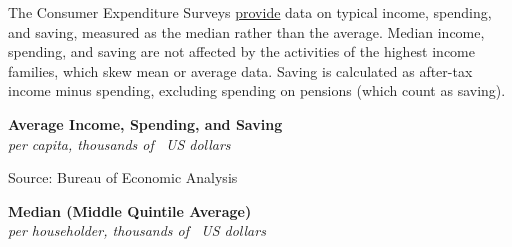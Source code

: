 \documentclass{report}
\makeatletter
\newcommand{\tbllink}[1]{\href{https://raw.githubusercontent.com/bdecon/US-chartbook/master/chartbook/data/#1}{\faTable}}
\newcommand*\short[1]{\expandafter\@gobbletwo\number\numexpr#1\relax}
\newcommand{\absnode}[3]{\node[below right, align=left] at (axis cs: #1,#2) {#3};}
\newcommand{\shdateaxisticks}{
		date coordinates in=x, axis line style={draw=none},
		xmax={2023-10-01},
		max space between ticks=40,	    
		xtick={{1990-01-01}, {1995-01-01}, {2000-01-01}, 
			{2005-01-01}, {2010-01-01}, {2015-01-01}, {2020-01-01}},
		minor xtick={},
		enlarge y limits={0.06}, enlarge x limits={0.01},
		}
\newcommand{\bbar}[2]{extra #1 ticks = {{#2}}, extra #1 tick labels = ,
		extra #1 tick style = {grid=major, grid style={thick, black!25}},}
\newcommand{\stdline}[4]{\addplot[very thick, no markers, color=#1] 
		table [x=#2, y=#3, col sep=comma] {#4};	}
\newcommand{\rbars}{
		\fill[color=black!10] (axis cs:{1990-07-01},\pgfkeysvalueof{/pgfplots/ymin}) rectangle 
			(axis cs:{1991-03-01}, \pgfkeysvalueof{/pgfplots/ymax});
		\fill[color=black!10] (axis cs:{2007-12-01},\pgfkeysvalueof{/pgfplots/ymin}) rectangle 
			(axis cs:{2009-07-01}, \pgfkeysvalueof{/pgfplots/ymax});
		\fill[color=black!10] (axis cs:{2001-03-01},\pgfkeysvalueof{/pgfplots/ymin}) rectangle 
			(axis cs:{2001-11-01}, \pgfkeysvalueof{/pgfplots/ymax});
		\fill[color=black!10] (axis cs:{2020-02-01},\pgfkeysvalueof{/pgfplots/ymin}) rectangle 
			(axis cs:{2020-05-01}, \pgfkeysvalueof{/pgfplots/ymax});}
\makeatother
\begin{document}
{\begin{minipage}{0.76\textwidth}


The Consumer Expenditure Surveys \href{https://www.bls.gov/cex/tables.htm}{provide} data on typical income, spending, and saving, measured as the median rather than the average. Median income, spending, and saving are not affected by the activities of the highest income families, which skew mean or average data. Saving is calculated as after-tax income minus spending, excluding spending on pensions (which count as saving). 
\end{minipage}
\vspace{2mm}

\begin{minipage}{0.435\textwidth}
\normalsize \textbf{Average Income, Spending, and Saving}\\
\footnotesize{\textit{per capita, thousands of \unskip \ US dollars}}
\vspace{5.9cm}

\hspace{4mm} 

\footnotesize{Source: Bureau of Economic Analysis} \hfill \tbllink{inc_out_save.csv}
\end{minipage} \hspace{6mm}
\begin{minipage}{0.435\textwidth}
\normalsize \textbf{Median (Middle Quintile Average)}\\
\footnotesize{\textit{per householder, thousands of \unskip \ US dollars}}
\vspace{5.9cm}


\end{minipage}}
\end{document}

